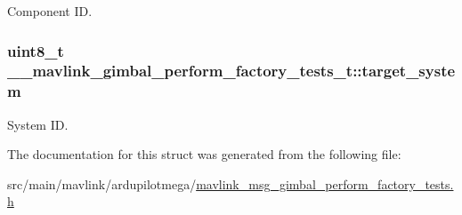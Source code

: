 Component I\+D. 

\hypertarget{struct____mavlink__gimbal__perform__factory__tests__t_a6ea64b154927838538b3a7c6675366d5}{
\subsubsection[{target\+\_\+system}]{\setlength{\rightskip}{0pt plus 5cm}uint8\+\_\+t \+\_\+\+\_\+mavlink\+\_\+gimbal\+\_\+perform\+\_\+factory\+\_\+tests\+\_\+t\+::target\+\_\+system}}\label{struct____mavlink__gimbal__perform__factory__tests__t_a6ea64b154927838538b3a7c6675366d5}


System I\+D. 



The documentation for this struct was generated from the following file\+:\begin{DoxyCompactItemize}
\item 
src/main/mavlink/ardupilotmega/\hyperlink{mavlink__msg__gimbal__perform__factory__tests_8h}{mavlink\+\_\+msg\+\_\+gimbal\+\_\+perform\+\_\+factory\+\_\+tests.\+h}\end{DoxyCompactItemize}
